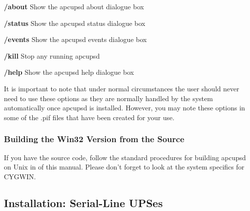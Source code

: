 {{{{{{{{{{\begin{description}
\item {\bf /about}
Show the apcupsd about dialogue box  

\item {\bf /status}
Show the apcupsd status dialogue box  

\item {\bf /events}
Show the apcupsd events dialogue box  

\item {\bf /kill}
Stop any running apcupsd  

\item {\bf /help}
Show the apcupsd help dialogue box 
\end{description}

It is important to note that under normal circumstances the user should never
need to use these options as they are normally handled by the system
automatically once apcupsd is installed. However, you may note these options
in some of the .pif files that have been created for your use. 

\label{Building-the-Win32-Version-from-the-Source}

\subsubsection*{Building the Win32 Version from the Source}

\label{index-Windows_002c-Building-187}
\label{index-Building_002c-Windows-188}
If you have the source code, follow the standard procedures for building
apcupsd on Unix in 
 of this manual. Please
don't forget to look at the system specifics for CYGWIN. 

\label{Installation-on-Serial_002dLine-UPSes}

\subsection*{Installation: Serial-Line UPSes}

\label{Overview-of-Serial_002dInterface-UPSes}

}}}}}}}}}}
